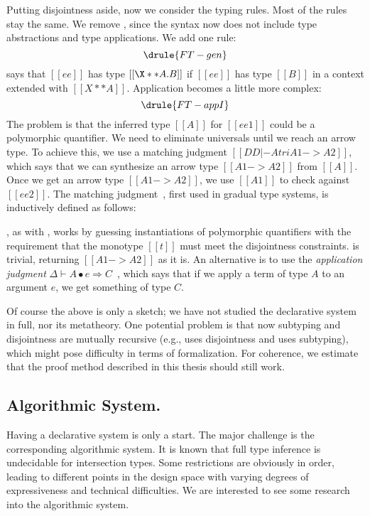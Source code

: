 Putting disjointness aside, now we consider the typing rules. Most of the rules
stay the same. We remove , since the syntax now does not
include type abstractions and type applications. We add one rule:
\[
  \drule{FT-gen}
\]
 says that $[[ee]]$ has type $[[\X ** A . B]]$ if $[[ee]]$ has type $[[B]]$ in a context extended with $[[ X ** A  ]]$.
Application becomes a little more complex:
\[
  \drule{FT-appI}
\]
The problem is that the inferred type $[[A]]$ for $[[ee1]]$ could be a
polymorphic quantifier.
We need to eliminate universals until we
reach an arrow type. To achieve this, we use a matching judgment $[[DD |- A tri A1 -> A2]]$,
which says that we can synthesize an arrow type $[[A1 -> A2]]$ from $[[A]]$.
Once we get an arrow type $[[A1 -> A2]]$, we use $[[A1]]$ to check against $[[ee2]]$.
The matching judgment~\citep{siek2015refined, xie2018consistent}, first used in gradual type systems, is inductively defined as follows:
\begin{mathpar}
\end{mathpar}
, as with , works by guessing instantiations of
polymorphic quantifiers with the requirement that the monotype $[[t]]$ must meet
the disjointness constraints.  is trivial, returning $[[A1 -> A2]]$
as it is. An alternative is to use the \textit{application judgment} $\Delta \vdash A \bullet e \Rightarrow C$~\citep{dunfield2013complete},
which says that if we apply a term of type $A$ to an argument $e$, we get something of type $C$.




Of course the above is only a sketch; we have not studied the declarative system in full,
nor its metatheory. One potential problem is that now subtyping and
disjointness are mutually recursive (e.g.,  uses disjointness and
 uses subtyping), which might pose difficulty in terms of
formalization. For coherence, we estimate that the proof method described in
this thesis should still work.



\subsection{Algorithmic System.}

Having a declarative system is only a start. The major challenge is the
corresponding algorithmic system. It is known that full type inference is
undecidable for intersection types. Some restrictions are obviously in order,
leading to different points in the design space with varying degrees of
expressiveness and technical difficulties. We are interested to see some
research into the algorithmic system.


